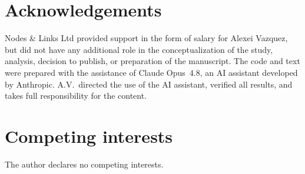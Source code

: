 \documentclass[a4paper,fleqn]{cas-sc}
\begin{document}
\section*{Acknowledgements}
Nodes \& Links Ltd provided support in the form of salary for Alexei Vazquez, but
did not have any additional role in the conceptualization of the study, analysis,
decision to publish, or preparation of the manuscript. The code and text were
prepared with the assistance of Claude Opus~4.8, an AI assistant developed by
Anthropic. A.V.\ directed the use of the AI assistant, verified all results, and
takes full responsibility for the content.

\section*{Competing interests}
The author declares no competing interests.
\end{document}
